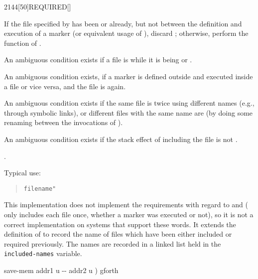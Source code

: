 \enlargethispage{6ex}
\begin{worddef}{2144}[50]{REQUIRED}[]%
\item {}

	If the file specified by  has been 
	or  already, but not between the definition and
	execution of a marker (or equivalent usage of ),
	discard ; otherwise, perform the function of
	.

	An ambiguous condition exists if a file is  while
	it is being  or .

	An ambiguous condition exists, if a marker is defined outside and
	executed inside a file or vice versa, and the file is
	 again.

	An ambiguous condition exists if the same file is 
	twice using different names (e.g., through symbolic links), or
	different files with the same name are  (by doing
	some renaming between the invocations of ).

	An ambiguous condition exists if the stack effect of including the
	file is not .

\see {}.

	\begin{rationale} %
		Typical use:
		\begin{quote}
			 \texttt{filename"} 
		\end{quote}
	\end{rationale}

	\begin{implement} %
		\dffamily
		This implementation does not implement the requirements with
		regard to  and  (
		only includes each file once, whether a marker was executed or
		not), so it is not a correct implementation on systems that
		support these words. It extends the definition of 
		to record the name of files which have been either included or
		required previously. The names are recorded in a linked list
		held in the \texttt{included-names} variable.

		\ttfamily
		\word{:} save-mem	 addr1 u -{}- addr2 u )  gforth \\
		  \\
		\tab {}  \\
		\tab {}   \\
		\tab {}   \word{ROT}   \word{;}


\end{implement}
\end{worddef}

